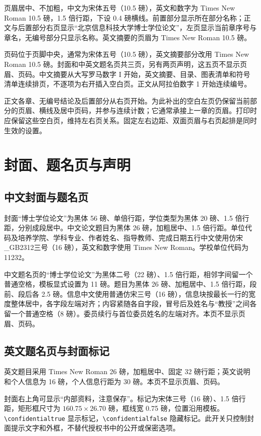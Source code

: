 页眉居中、不加粗，中文为宋体五号（10.5 磅），英文和数字为 Times New Roman 10.5 磅，1.5 倍行距，下设 0.4 磅横线。前置部分显示所在部分名称；正文与后置部分右页显示“北京信息科技大学博士学位论文”，左页显示当前章序号与章名，无编号部分只显示名称。英文摘要的页眉为 Times New Roman 10.5 磅。

页码位于页脚中央，通常为宋体五号（10.5 磅），英文摘要部分改用 Times New Roman 10.5 磅。封面和中英文题名页共三页，另有两页声明，这五页不显示页眉、页码。中文摘要从大写罗马数字 I 开始，英文摘要、目录、图表清单和符号清单连续排页，不逐项为右开插入空白页。正文从阿拉伯数字 1 开始连续编号。

正文各章、无编号结论及后置部分从右页开始。为此补出的空白左页仍保留当前部分的页眉、横线及居中页码，并参与连续计数；它通常承接上一章的页眉。打印时应保留这些空白页，维持左右页关系。固定左右边距、双面页眉与右页起排是同时生效的设置。

\section{封面、题名页与声明}

\subsection{中文封面与题名页}

封面“博士学位论文”为黑体 56 磅、单倍行距，学位类型为黑体 20 磅、1.5 倍行距，分别成段居中。中文论文题目为黑体 26 磅，加粗居中、1.5 倍行距。单位代码及培养学院、学科专业、作者姓名、指导教师、完成日期五行中文使用仿宋\_GB2312三号（16 磅），英文和数字使用 Times New Roman。学校单位代码为 11232。

中文题名页的“博士学位论文”为黑体二号（22 磅）、1.5 倍行距，相邻字间留一个普通空格，模板显式设置为 11 磅。题目为黑体 26 磅、加粗居中、1.5 倍行距，段前、段后各 2.5 磅。信息中文使用普通仿宋三号（16 磅），信息块按最长一行的宽度整体居中，各字段左端对齐；内容紧随各自字段，冒号后及姓名与“教授”之间各留一个普通空格（8 磅）。委员续行与首位委员姓名的左端对齐。本页不显示页眉、页码。

\subsection{英文题名页与封面标记}

英文题目采用 Times New Roman 26 磅，加粗居中、固定 32 磅行距；英文说明和个人信息为 16 磅，个人信息行距为 30 磅。本页不显示页眉、页码。

封面右上角可显示“内部资料，注意保存”。标记为宋体三号（16 磅）、1.5 倍行距，矩形框尺寸为 $160.75\times26.70$ 磅，框线宽 0.75 磅，位置沿用模板。\verb|\confidentialtrue| 显示标记，\verb|\confidentialfalse| 隐藏标记。此开关只控制封面提示文字和外框，不替代授权书中的公开或保密选项。

